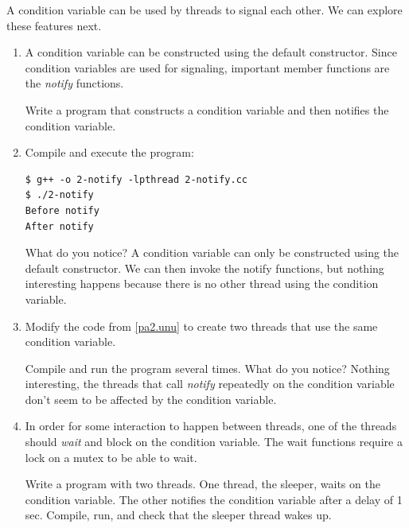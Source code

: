 \documentclass[12pt]{book}
\begin{document}
A condition variable can be used by threads to signal each other. We can explore these features next.

\begin{enumerate}[label=Activity \arabic*:]

\item\label{pa2.unu} A condition variable can be constructed using the default constructor. Since condition variables are used for signaling, important  member functions are the \emph{notify} functions. 

  Write a program that constructs a condition variable and then notifies the condition variable.

  

\item Compile and execute the program:

  \begin{lstlisting}
$ g++ -o 2-notify -lpthread 2-notify.cc 
$ ./2-notify 
Before notify
After notify
  \end{lstlisting}

  What do you notice? A condition variable can only be constructed using the default constructor. We can then invoke the notify functions, but nothing interesting happens because there is no other thread using the condition variable.

\item Modify the code from \ref{pa2.unu} to create two threads that use the same condition variable.

  

  Compile and run the program several times. What do you notice? Nothing interesting, the threads that call \emph{notify} repeatedly on the condition variable don't seem to be affected by the condition variable.

\item In order for some interaction to happen between threads, one of the threads should \emph{wait} and block on the condition variable. The wait functions require a lock on a mutex to be able to wait.

  Write a program with two threads. One thread, the sleeper, waits on the condition variable. The other notifies the condition variable after a delay of 1 sec. Compile, run, and check that the sleeper thread wakes up.

  
\end{enumerate}
\end{document}
